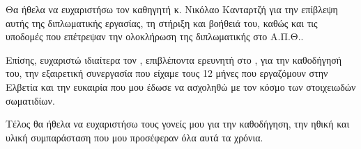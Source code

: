\begin{acknowledgements}
Θα ήθελα να ευχαριστήσω τον καθηγητή κ. Νικόλαο Κανταρτζή για την επίβλεψη αυτής της διπλωματικής εργασίας, τη στήριξη και βοήθειά του, καθώς και τις υποδομές που επέτρεψαν την ολοκλήρωση της διπλωματικής στο Α.Π.Θ..

Επίσης, ευχαριστώ ιδιαίτερα τον , επιβλέποντα ερευνητή στο , για την καθοδήγησή του, την εξαιρετική συνεργασία που είχαμε τους 12 μήνες που εργαζόμουν στην Ελβετία και την ευκαιρία που μου έδωσε να ασχοληθώ με τον κόσμο των στοιχειωδών σωματιδίων. 

Τέλος θα ήθελα να ευχαριστήσω τους γονείς μου για την καθοδήγηση, την ηθική και υλική συμπαράσταση που μου προσέφεραν όλα αυτά τα χρόνια.
\end{acknowledgements}